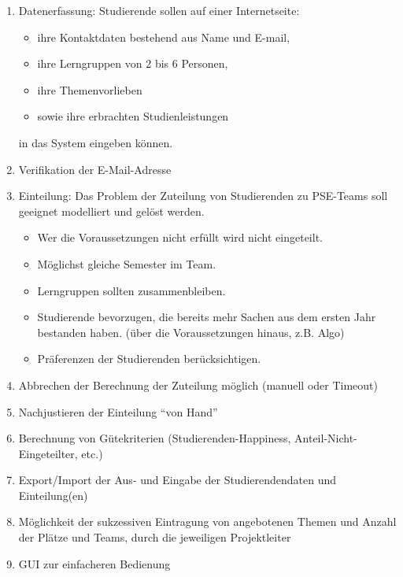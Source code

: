\documentclass[parskip=full]{scrartcl}
\begin{document}
\begin{enumerate}[{Z}1]
    \item Datenerfassung: Studierende sollen auf einer Internetseite:   
    \begin{itemize}
        \item ihre Kontaktdaten bestehend aus Name und E-mail,
        \item ihre Lerngruppen von 2 bis 6 Personen,
        \item ihre Themenvorlieben 
        \item sowie ihre erbrachten Studienleistungen 
    \end{itemize}
    in das System eingeben können.
    
    \item  Verifikation der E-Mail-Adresse
    

    \item Einteilung: Das Problem der Zuteilung von Studierenden zu PSE-Teams
    soll geeignet modelliert und gelöst werden. 
        \begin{itemize}
        \item Wer die Voraussetzungen nicht erfüllt wird nicht eingeteilt.

        \item Möglichst gleiche Semester im Team.

        \item Lerngruppen sollten zusammenbleiben.

        \item Studierende bevorzugen, die bereits mehr Sachen aus dem ersten Jahr
        bestanden haben. (über die Voraussetzungen hinaus, z.B. Algo)

        \item Präferenzen der Studierenden berücksichtigen.
        \end{itemize}

    \item Abbrechen der Berechnung der Zuteilung möglich (manuell oder Timeout)

    \item Nachjustieren der Einteilung “von Hand”

    \item Berechnung von Gütekriterien (Studierenden-Happiness,
    Anteil-Nicht-Eingeteilter, etc.) 
    

    \item Export/Import der Aus- und Eingabe der Studierendendaten und
    Einteilung(en)

    \item Möglichkeit der sukzessiven Eintragung von angebotenen Themen und
    Anzahl der Plätze und Teams, durch die jeweiligen Projektleiter

    \item GUI zur einfacheren Bedienung

    

    
\end{enumerate}
\end{document}
